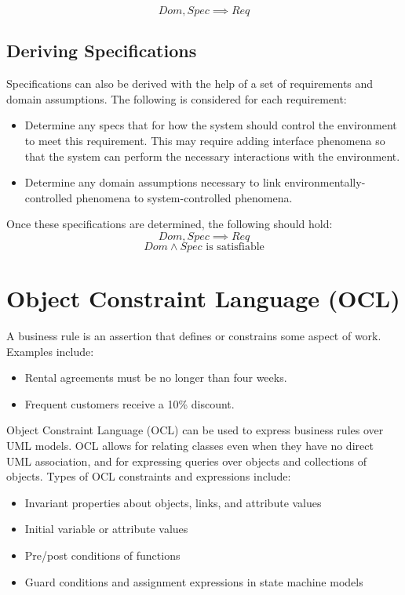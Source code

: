 \documentclass[12pt,titlepage]{article}
\begin{document}
      $$ Dom, Spec \implies Req $$

    \subsection{Deriving Specifications}
      Specifications can also be derived with the help of a set of requirements and domain assumptions. The following is considered for each requirement:
      \begin{itemize}
        \item Determine any specs that for how the system should control the environment to meet this requirement. This may require adding interface phenomena
          so that the system can perform the necessary interactions with the environment.
        \item Determine any domain assumptions necessary to link environmentally-controlled phenomena to system-controlled phenomena.
      \end{itemize}

      Once these specifications are determined, the following should hold:
      $$ Dom, Spec \implies Req $$
      $$ Dom \land Spec \text{ is satisfiable}$$

  \newpage

  \section{Object Constraint Language (OCL)}
    A business rule is an assertion that defines or constrains some aspect of work. Examples include:
    \begin{itemize}
      \item Rental agreements must be no longer than four weeks.
      \item Frequent customers receive a 10\% discount.
    \end{itemize}

    Object Constraint Language (OCL) can be used to express business rules over UML models. OCL allows for relating classes even when they have no direct UML
    association, and for expressing queries over objects and collections of objects. Types of OCL constraints and expressions include:
    \begin{itemize}
      \item Invariant properties about objects, links, and attribute values
      \item Initial variable or attribute values
      \item Pre/post conditions of functions
      \item Guard conditions and assignment expressions in state machine models
    \end{itemize}
\end{document}
